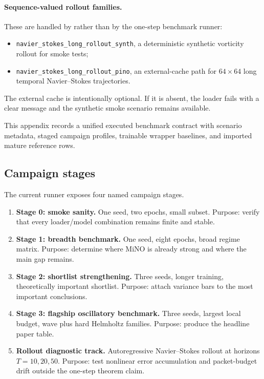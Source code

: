 \paragraph{Sequence-valued rollout families.}
These are handled by  rather than by the one-step benchmark runner:
\begin{itemize}
\item \texttt{navier\_stokes\_long\_rollout\_synth}, a deterministic synthetic vorticity rollout for smoke tests;
\item \texttt{navier\_stokes\_long\_rollout\_pino}, an external-cache path for $64\times64$ long temporal Navier--Stokes trajectories.
\end{itemize}
The external cache is intentionally optional. If it is absent, the loader fails with a clear message and the synthetic smoke scenario remains available.

This appendix records a unified executed benchmark contract with scenario metadata, staged campaign profiles, trainable wrapper baselines, and imported mature reference rows.

\subsection{Campaign stages}

The current runner exposes four named campaign stages.

\begin{enumerate}
\item \textbf{Stage 0: smoke sanity.} One seed, two epochs, small subset. Purpose: verify that every loader/model combination remains finite and stable.
\item \textbf{Stage 1: breadth benchmark.} One seed, eight epochs, broad regime matrix. Purpose: determine where MiNO is already strong and where the main gap remains.
\item \textbf{Stage 2: shortlist strengthening.} Three seeds, longer training, theoretically important shortlist. Purpose: attach variance bars to the most important conclusions.
\item \textbf{Stage 3: flagship oscillatory benchmark.} Three seeds, largest local budget, wave plus hard Helmholtz families. Purpose: produce the headline paper table.
\item \textbf{Rollout diagnostic track.} Autoregressive Navier--Stokes rollout at horizons $T=10,20,50$. Purpose: test nonlinear error accumulation and packet-budget drift outside the one-step theorem claim.
\end{enumerate}

